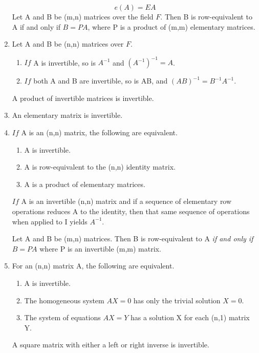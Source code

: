 \documentclass[12pt, a4paper]{article}
\begin{document}
\begin{CJK*}{UTF8}{bsmi}
\begin{enumerate}
\begin{equation}
        e(A) = EA
    \end{equation}
    Let A and B be (m,n) matrices over the field \(F\). Then B is row-equivalent to A if and only if \(B=PA\), where P is a product of (m,m) elementary matrices.
    \item Let A and B be (n,n) matrices over \(F\).\begin{enumerate}
        \item \(If\) A is invertible, so is \(A^{-1}\) and \({(A^{-1})}^{-1}=A\).
        \item \(If\) both A and B are invertible, so is AB, and \({(AB)}^{-1} = B^{-1}A^{-1}\).
    \end{enumerate}
    A product of invertible matrices is invertible.
    \item An elementary matrix is invertible.
    \item \(If\) A is an (n,n) matrix, the following are equivalent.\begin{enumerate}
        \item A is invertible.
        \item A is row-equivalent to the (n,n) identity matrix.
        \item A is a product of elementary matrices.
    \end{enumerate}
    \(If\) A is an invertible (n,n) matrix and if a sequence of elementary row operations reduces A to the identity, then that same sequence of operations when applied to I yields \(A^{-1}\).
    
    Let A and B be (m,n) matrices. Then B is row-equivalent to A \emph{if and only if} \(B=PA\) where P is an invertible (m,m) matrix.
    \item For an (n,n) matrix A, the following are equivalent.\begin{enumerate}
        \item A is invertible.
        \item The homogeneous system \(AX=0\) has only the trivial solution \(X=0\).
        \item The system of equations \(AX=Y\) has a solution X for each (n,1) matrix Y.
    \end{enumerate}
     A square matrix with either a left or right inverse is invertible.


\end{enumerate}
\end{CJK*}
\end{document}
